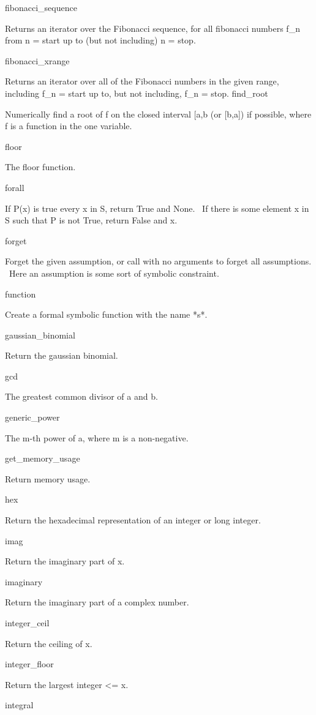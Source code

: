 \documentclass[12pt,twoside]{book}
\begin{document}
fibonacci\_sequence

Returns an iterator over the Fibonacci sequence, for all fibonacci numbers f\_n from n = start up to (but not including) n = stop.

fibonacci\_xrange

Returns an iterator over all of the Fibonacci numbers in the given range, including f\_n = start up to, but not including, f\_n = stop.  find\_root

Numerically find a root of f on the closed interval [a,b (or [b,a]) if possible, where f is a function in the one variable.

floor

The floor function.

forall

If P(x) is true every x in S, return True and None. \ If there is some element x in S such that P is not True, return False and x.

forget

Forget the given assumption, or call with no arguments to forget all assumptions. \ Here an assumption is some sort of symbolic constraint.

function

Create a formal symbolic function with the name *s*.

gaussian\_binomial

Return the gaussian binomial.

gcd

The greatest common divisor of a and b.

generic\_power

The m{}-th power of a, where m is a non{}-negative.

get\_memory\_usage

Return memory usage.

hex

Return the hexadecimal representation of an integer or long integer.

imag

Return the imaginary part of x.

imaginary

Return the imaginary part of a complex number.

integer\_ceil

Return the ceiling of x.

integer\_floor

Return the largest integer {\textless}= x.

integral \ \ \ \ 
\end{document}
